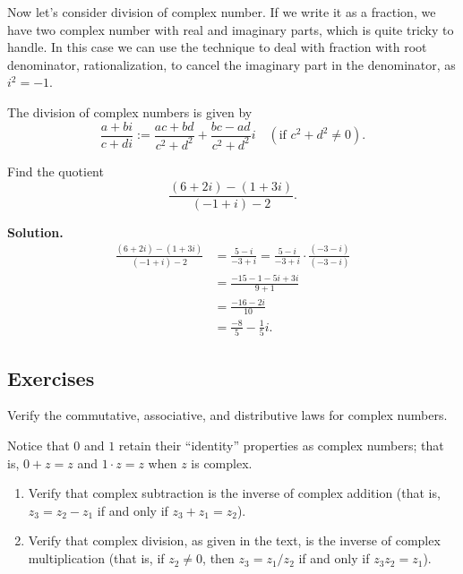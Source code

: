 \documentclass[
	12pt, %
	fleqn, %
	a4paper, %
]{LegrandOrangeBook}
\begin{document}
Now let's consider division of complex number. If we write it as a fraction, we have two complex number with real and imaginary parts, which is quite tricky to handle.
In this case we can use the technique to deal with fraction with root denominator, rationalization, to cancel the imaginary part in the denominator, as $i^2=-1$.
\begin{definition}
    The division of complex numbers is given by
\[
\frac{a + bi}{c + di} := \frac{ac + bd}{c^2 + d^2} + \frac{bc - ad}{c^2 + d^2}i \quad (\text{if } c^2 + d^2 \neq 0).
\]
\end{definition}

\begin{example}
    Find the quotient
\[
\frac{(6 + 2i) - (1 + 3i)}{(-1 + i) - 2}.
\]
\end{example}
\textbf{Solution.}
\begin{align*}
\frac{(6 + 2i) - (1 + 3i)}{(-1 + i) - 2} &= \frac{5 - i}{-3 + i} = \frac{5 - i}{-3 + i} \cdot \frac{(-3 - i)}{(-3 - i)} \\
&= \frac{-15 - 1 - 5i + 3i}{9 + 1} \\
&= \frac{-16 - 2i}{10} \\
&= \frac{-8}{5} - \frac{1}{5}i. 
\end{align*}

\subsection{Exercises}
\begin{exercise}
    Verify the commutative, associative, and distributive laws for complex numbers.
\end{exercise}

\begin{exercise}
    Notice that \(0\) and \(1\) retain their “identity” properties as complex numbers; that is, \(0 + z = z\) and \(1 \cdot z = z\) when \(z\) is complex.
    \begin{enumerate}[label=(\alph*)]
        \item Verify that complex subtraction is the inverse of complex addition (that is, \(z_3 = z_2 - z_1\) if and only if \(z_3 + z_1 = z_2\)).
        \item Verify that complex division, as given in the text, is the inverse of complex multiplication (that is, if \(z_2 \neq 0\), then \(z_3 = z_1 / z_2\) if and only if \(z_3z_2 = z_1\)).
    \end{enumerate}
    \end{exercise}
\end{document}
